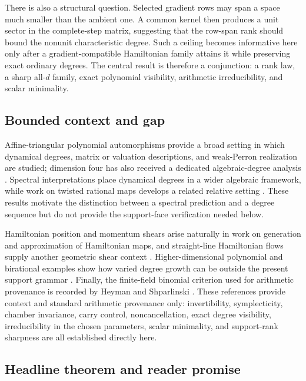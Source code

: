 \documentclass[11pt,letterpaper]{article}
\theoremstyle{plain}
\begin{document}
There is also a structural question.  Selected gradient rows may span a space much smaller than the ambient one.  A common kernel then produces a unit sector in the complete-step matrix, suggesting that the row-span rank should bound the nonunit characteristic degree.  Such a ceiling becomes informative here only after a gradient-compatible Hamiltonian family attains it while preserving exact ordinary degrees.  The central result is therefore a conjunction: a rank law, a sharp all-$d$ family, exact polynomial visibility, arithmetic irreducibility, and scalar minimality.

\subsection{Bounded context and gap}

Affine-triangular polynomial automorphisms provide a broad setting in which dynamical degrees, matrix or valuation descriptions, and weak-Perron realization are studied; dimension four has also received a dedicated algebraic-degree analysis \cite{BvS,SS}.  Spectral interpretations place dynamical degrees in a wider algebraic framework, while work on twisted rational maps develops a related relative setting \cite{DF,AX}.  These results motivate the distinction between a spectral prediction and a degree sequence but do not provide the support-face verification needed below.

Hamiltonian position and momentum shears arise naturally in work on generation and approximation of Hamiltonian maps, and straight-line Hamiltonian flows supply another geometric shear context \cite{BT,KL}.  Higher-dimensional polynomial and birational examples show how varied degree growth can be outside the present support grammar \cite{Des}.  Finally, the finite-field binomial criterion used for arithmetic provenance is recorded by Heyman and Shparlinski \cite{HS}.  These references provide context and standard arithmetic provenance only: invertibility, symplecticity, chamber invariance, carry control, noncancellation, exact degree visibility, irreducibility in the chosen parameters, scalar minimality, and support-rank sharpness are all established directly here.

\subsection{Headline theorem and reader promise}
\end{document}
